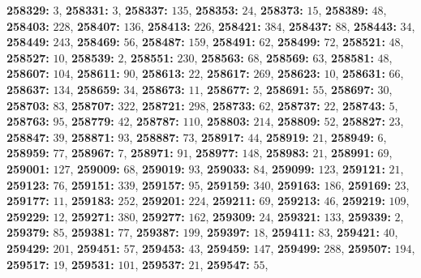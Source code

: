 \textsf{\bfseries 258329:} $3$, \textsf{\bfseries 258331:} $3$, \textsf{\bfseries 258337:} $135$, \textsf{\bfseries 258353:} $24$, \textsf{\bfseries 258373:} $15$, \textsf{\bfseries 258389:} $48$, \textsf{\bfseries 258403:} $228$, \textsf{\bfseries 258407:} $136$, \textsf{\bfseries 258413:} $226$, \textsf{\bfseries 258421:} $384$, \textsf{\bfseries 258437:} $88$, \textsf{\bfseries 258443:} $34$, \textsf{\bfseries 258449:} $243$, \textsf{\bfseries 258469:} $56$, \textsf{\bfseries 258487:} $159$, \textsf{\bfseries 258491:} $62$, \textsf{\bfseries 258499:} $72$, \textsf{\bfseries 258521:} $48$, \textsf{\bfseries 258527:} $10$, \textsf{\bfseries 258539:} $2$, \textsf{\bfseries 258551:} $230$, \textsf{\bfseries 258563:} $68$, \textsf{\bfseries 258569:} $63$, \textsf{\bfseries 258581:} $48$, \textsf{\bfseries 258607:} $104$, \textsf{\bfseries 258611:} $90$, \textsf{\bfseries 258613:} $22$, \textsf{\bfseries 258617:} $269$, \textsf{\bfseries 258623:} $10$, \textsf{\bfseries 258631:} $66$, \textsf{\bfseries 258637:} $134$, \textsf{\bfseries 258659:} $34$, \textsf{\bfseries 258673:} $11$, \textsf{\bfseries 258677:} $2$, \textsf{\bfseries 258691:} $55$, \textsf{\bfseries 258697:} $30$, \textsf{\bfseries 258703:} $83$, \textsf{\bfseries 258707:} $322$, \textsf{\bfseries 258721:} $298$, \textsf{\bfseries 258733:} $62$, \textsf{\bfseries 258737:} $22$, \textsf{\bfseries 258743:} $5$, \textsf{\bfseries 258763:} $95$, \textsf{\bfseries 258779:} $42$, \textsf{\bfseries 258787:} $110$, \textsf{\bfseries 258803:} $214$, \textsf{\bfseries 258809:} $52$, \textsf{\bfseries 258827:} $23$, \textsf{\bfseries 258847:} $39$, \textsf{\bfseries 258871:} $93$, \textsf{\bfseries 258887:} $73$, \textsf{\bfseries 258917:} $44$, \textsf{\bfseries 258919:} $21$, \textsf{\bfseries 258949:} $6$, \textsf{\bfseries 258959:} $77$, \textsf{\bfseries 258967:} $7$, \textsf{\bfseries 258971:} $91$, \textsf{\bfseries 258977:} $148$, \textsf{\bfseries 258983:} $21$, \textsf{\bfseries 258991:} $69$, \textsf{\bfseries 259001:} $127$, \textsf{\bfseries 259009:} $68$, \textsf{\bfseries 259019:} $93$, \textsf{\bfseries 259033:} $84$, \textsf{\bfseries 259099:} $123$, \textsf{\bfseries 259121:} $21$, \textsf{\bfseries 259123:} $76$, \textsf{\bfseries 259151:} $339$, \textsf{\bfseries 259157:} $95$, \textsf{\bfseries 259159:} $340$, \textsf{\bfseries 259163:} $186$, \textsf{\bfseries 259169:} $23$, \textsf{\bfseries 259177:} $11$, \textsf{\bfseries 259183:} $252$, \textsf{\bfseries 259201:} $224$, \textsf{\bfseries 259211:} $69$, \textsf{\bfseries 259213:} $46$, \textsf{\bfseries 259219:} $109$, \textsf{\bfseries 259229:} $12$, \textsf{\bfseries 259271:} $380$, \textsf{\bfseries 259277:} $162$, \textsf{\bfseries 259309:} $24$, \textsf{\bfseries 259321:} $133$, \textsf{\bfseries 259339:} $2$, \textsf{\bfseries 259379:} $85$, \textsf{\bfseries 259381:} $77$, \textsf{\bfseries 259387:} $199$, \textsf{\bfseries 259397:} $18$, \textsf{\bfseries 259411:} $83$, \textsf{\bfseries 259421:} $40$, \textsf{\bfseries 259429:} $201$, \textsf{\bfseries 259451:} $57$, \textsf{\bfseries 259453:} $43$, \textsf{\bfseries 259459:} $147$, \textsf{\bfseries 259499:} $288$, \textsf{\bfseries 259507:} $194$, \textsf{\bfseries 259517:} $19$, \textsf{\bfseries 259531:} $101$, \textsf{\bfseries 259537:} $21$, \textsf{\bfseries 259547:} $55$, 
